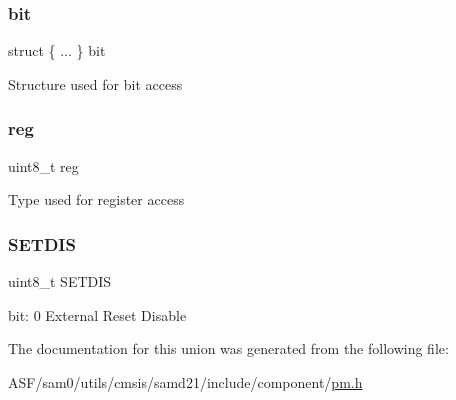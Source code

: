 \subsubsection{\texorpdfstring{bit}{bit}}
{\footnotesize\ttfamily struct \{ ... \}   bit}

Structure used for bit access \mbox{\label{union_p_m___e_x_t_c_t_r_l___type_a9428adc9af4653a2050e2536b55dec8d}} 
\subsubsection{\texorpdfstring{reg}{reg}}
{\footnotesize\ttfamily uint8\+\_\+t reg}

Type used for register access \mbox{\label{union_p_m___e_x_t_c_t_r_l___type_a7d18439c851060a7996e4e50255b5b27}} 
\subsubsection{\texorpdfstring{SETDIS}{SETDIS}}
{\footnotesize\ttfamily uint8\+\_\+t S\+E\+T\+D\+IS}

bit\+: 0 External Reset Disable 

The documentation for this union was generated from the following file\+:\begin{DoxyCompactItemize}
\item 
A\+S\+F/sam0/utils/cmsis/samd21/include/component/\mbox{\hyperlink{component_2pm_8h}{pm.\+h}}\end{DoxyCompactItemize}
